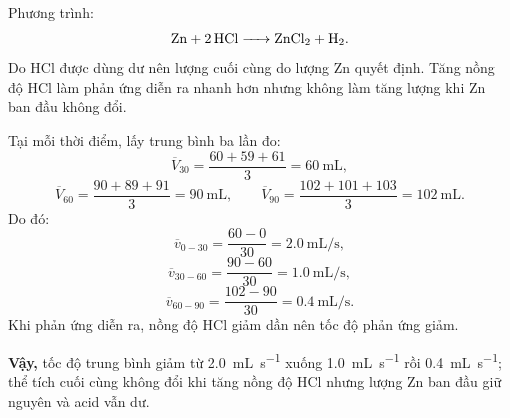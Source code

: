\begin{loigiaiBT}
Phương trình:
\[
\ce{Zn + 2HCl -> ZnCl2 + H2}.
\]
Do HCl được dùng dư nên lượng  cuối cùng do lượng Zn quyết định. Tăng nồng độ HCl làm phản ứng diễn ra nhanh hơn nhưng không làm tăng lượng  khi Zn ban đầu không đổi.

Tại mỗi thời điểm, lấy trung bình ba lần đo:
\[
\overline V_{30}=\frac{60+59+61}{3}=\SI{60}{\milli\liter},
\]
\[
\overline V_{60}=\frac{90+89+91}{3}=\SI{90}{\milli\liter},
\qquad
\overline V_{90}=\frac{102+101+103}{3}=\SI{102}{\milli\liter}.
\]
Do đó:
\[
\overline v_{0-30}=\frac{60-0}{30}=\SI{2.0}{\milli\liter\per\second},
\]
\[
\overline v_{30-60}=\frac{90-60}{30}=\SI{1.0}{\milli\liter\per\second},
\]
\[
\overline v_{60-90}=\frac{102-90}{30}=\SI{0.4}{\milli\liter\per\second}.
\]
Khi phản ứng diễn ra, nồng độ HCl giảm dần nên tốc độ phản ứng giảm.

\textbf{Vậy,} tốc độ trung bình giảm từ \SI{2.0}{\milli\liter\per\second} xuống \SI{1.0}{\milli\liter\per\second} rồi \SI{0.4}{\milli\liter\per\second}; thể tích  cuối cùng không đổi khi tăng nồng độ HCl nhưng lượng Zn ban đầu giữ nguyên và acid vẫn dư.
\end{loigiaiBT}
